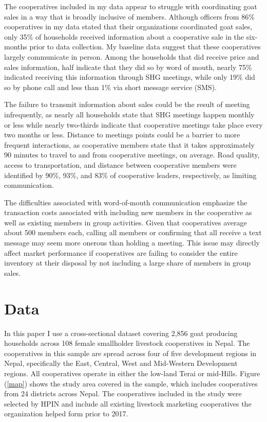 \documentclass[11pt]{article}
\begin{document}
The cooperatives included in my data appear to struggle with coordinating goat sales in a way that is broadly inclusive of members. Although officers from 86\% cooperatives in my data stated that their organizations coordinated goat sales, only 35\% of households received information about a cooperative sale in the six-months prior to data collection. My baseline data suggest that these cooperatives largely communicate in person. Among the households that did receive price and sales information, half indicate that they did so by word of mouth, nearly 75\% indicated receiving this information through SHG meetings, while only 19\% did so by phone call and less than 1\% via short message service (SMS).

The failure to transmit information about sales could be the result of meeting infrequently, as nearly all households state that SHG meetings happen monthly or less while nearly two-thirds indicate that cooperative meetings take place every two months or less. Distance to meetings points could be a barrier to more frequent interactions, as cooperative members state that it takes approximately 90 minutes to travel to and from cooperative meetings, on average. Road quality, access to transportation, and distance between cooperative members were identified by 90\%, 93\%, and 83\% of cooperative leaders, respectively, as limiting communication.

The difficulties associated with word-of-mouth communication emphasize the transaction costs associated with including new members in the cooperative as well as existing members in group activities. Given that cooperatives average about 500 members each, calling all members or confirming that all receive a text message may seem more onerous than holding a meeting. This issue may directly affect market performance if cooperatives are failing to consider the entire inventory at their disposal by not including a large share of members in group sales. 

\section{Data} \label{sec:data}
In this paper I use a cross-sectional dataset covering 2,856 goat producing households across 108 female smallholder livestock cooperatives in Nepal. The cooperatives in this sample are spread across four of five development regions in Nepal, specifically the East, Central, West and Mid-Western Development regions. All cooperatives operate in either the low-land Terai or mid-Hills. Figure (\ref{map}) shows the study area covered in the sample, which includes cooperatives from 24 districts across Nepal. The cooperatives included in the study were selected by HPIN and include all existing livestock marketing cooperatives the organization helped form prior to 2017.
\end{document}
